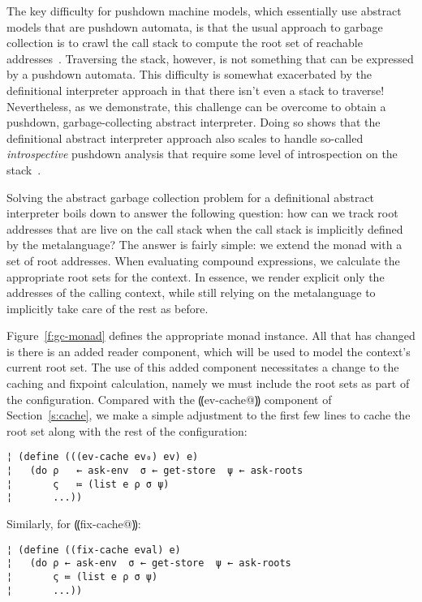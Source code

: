 The key difficulty for pushdown machine models, which essentially use
abstract models that are pushdown automata, is that the usual approach
to garbage collection is to crawl the call stack to compute the root
set of reachable addresses~\cite{dvanhorn:Morrisett1995Abstract}.
Traversing the stack, however, is not something that can be expressed
by a pushdown automata.
%
This difficulty is somewhat exacerbated by the definitional
interpreter approach in that there isn't even a stack to traverse!
Nevertheless, as we demonstrate, this challenge can be overcome to
obtain a pushdown, garbage-collecting abstract interpreter.
%
Doing so shows that the definitional abstract interpreter approach
also scales to handle so-called \emph{introspective} pushdown analysis
that require some level of introspection on the
stack~\cite{dvanhorn:Earl2012Introspective,dvanhorn:Johnson2014Pushdown}.

Solving the abstract garbage collection problem for a definitional
abstract interpreter boils down to answer the following question: how
can we track root addresses that are live on the call stack when the
call stack is implicitly defined by the metalanguage?  The answer is
fairly simple: we extend the monad with a set of root addresses.  When
evaluating compound expressions, we calculate the appropriate root
sets for the context.  In essence, we render explicit only the
addresses of the calling context, while still relying on the
metalanguage to implicitly take care of the rest as before.

Figure~\ref{f:gc-monad} defines the appropriate monad instance.  All
that has changed is there is an added reader component, which will be
used to model the context's current root set.
%
The use of this added component necessitates a change to the caching
and fixpoint calculation, namely we must include the root sets as part
of the configuration.  Compared with the ⸨ev-cache@⸩ component of
Section~\ref{s:cache}, we make a simple adjustment to the first few
lines to cache the root set along with the rest of the configuration:
\begin{lstlisting}
¦ (define (((ev-cache ev₀) ev) e)
¦   (do ρ   ← ask-env  σ ← get-store  ψ ← ask-roots
¦       ς   ≔ (list e ρ σ ψ)
¦       ...))
\end{lstlisting}
Similarly, for ⸨fix-cache@⸩:
\begin{lstlisting}
¦ (define ((fix-cache eval) e)  
¦   (do ρ ← ask-env  σ ← get-store  ψ ← ask-roots
¦       ς ≔ (list e ρ σ ψ)
¦       ...))
\end{lstlisting}

